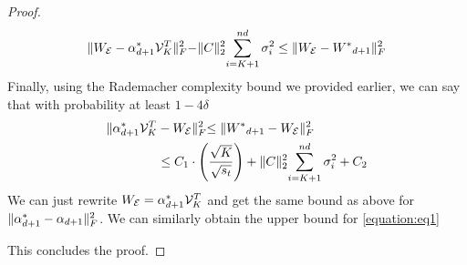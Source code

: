 \begin{theorem}
\begin{proof}
\begin{align*}
        \lVert W_{\mathcal{E}} - \alpha^{*}_{d+1}\mathcal{V}^T_{K} \lVert^2_F - \lVert C\lVert^2_2\sum_{i=K+1}^{nd}\sigma^2_i \leq \Vert W_{\mathcal{E}} - {W^*}_{d+1}\lVert^2_F
    \end{align*}
    Finally, using the Rademacher complexity bound we provided earlier, 
    we can say that with probability at least $1-4\delta$
    \begin{align*}
        \lVert \alpha^{*}_{d+1}\mathcal{V}^T_{K} &- W_{\mathcal{E}} \lVert^2_F \leq  \lVert{W^*}_{d+1} - W_{\mathcal{E}}\lVert^2_F\\
        &\leq C_1\cdot\Bigg(\frac{\sqrt{K}}{\sqrt{s_t}} \Bigg) + \lVert C\lVert^2_2\sum_{i=K+1}^{nd}\sigma^2_i + C_2
    \end{align*}
    We can just rewrite $W_{\mathcal{E}} = \alpha^{*}_{d+1}\mathcal{V}^T_{K}$ and get the same bound as above for $\lVert \alpha^{*}_{d+1} - \alpha_{d+1}\lVert^2_F$.
    We can similarly obtain the upper bound for \ref{equation:eq1}
    
    This concludes the proof. 
\end{proof}
\end{theorem}
    
